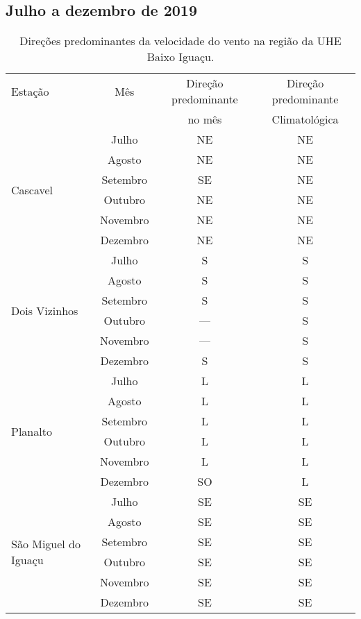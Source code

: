 \documentclass[a4paper,12pt]{article}
\begin{document}
\subsection{Julho a dezembro de 2019}

\begin{table}[!hbt]
\begin{center}
\caption{Direções predominantes da velocidade do vento na região da UHE Baixo Iguaçu.}
\label{tab:dire_0}
\begin{tabular}{lccc}
\hline
Estação & Mês & Direção predominante & Direção predominante \\
        &     &      no mês          &      Climatológica   \\
\hline\multirow{6}{*}{Cascavel} & Julho & NE & NE \\
            & Agosto & NE & NE \\
            & Setembro & SE & NE \\
            & Outubro & NE & NE \\
            & Novembro & NE & NE \\
            & Dezembro & NE & NE \\
\hline\multirow{6}{*}{Dois Vizinhos} & Julho & S & S \\
            & Agosto & S & S \\
            & Setembro & S & S \\
            & Outubro & --- & S \\
            & Novembro & --- & S \\
            & Dezembro & S & S \\
\hline\multirow{6}{*}{Planalto} & Julho & L & L \\
            & Agosto & L & L \\
            & Setembro & L & L \\
            & Outubro & L & L \\
            & Novembro & L & L \\
            & Dezembro & SO & L \\
\hline\multirow{6}{*}{São Miguel do Iguaçu} & Julho & SE & SE \\
            & Agosto & SE & SE \\
            & Setembro & SE & SE \\
            & Outubro & SE & SE \\
            & Novembro & SE & SE \\
            & Dezembro & SE & SE \\

\end{tabular}
\end{center}
\end{table}
\end{document}
